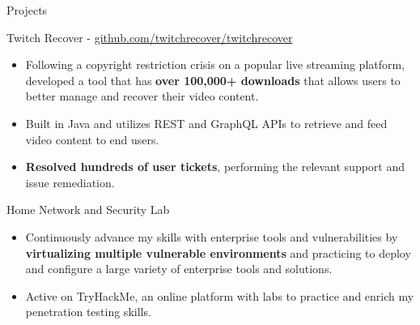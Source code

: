 \documentclass{article}
\newlength{\tabin}
\newlength{\secsep}
\newcommand{\lineunder}{\vspace*{-8pt} \\ \hspace*{-6pt} \hrulefill \\ \vspace*{-15pt}}
\newenvironment{tabbedsection}[1]{
  \begin{list}{}{
      \setlength{\itemsep}{0pt}
      \setlength{\labelsep}{0pt}
      \setlength{\labelwidth}{0pt}
      \setlength{\leftmargin}{\tabin}
      \setlength{\rightmargin}{\tabin}
      \setlength{\listparindent}{0pt}
      \setlength{\parsep}{0pt}
      \setlength{\parskip}{0pt}
      \setlength{\partopsep}{0pt}
      \setlength{\topsep}{#1}
    }
  \item[]
}{\end{list}}
\newenvironment{resume_section}[1]{
  \filbreak
  \vspace{2\secsep}
  \textsc{\color{blue}\large#1}
  \lineunder
  \begin{tabbedsection}{\secsep}
}{\end{tabbedsection}}
\newenvironment{resume_subsection}[2][]{
  \textbf{\color{BlueViolet}#2} \hfill {\normalsize #1} \hspace{-5em} 
  \begin{tabbedsection}{0.5\secsep}
}{\end{tabbedsection}}
\newenvironment{subitems}{
  \renewcommand{\labelitemi}{-}
  \begin{itemize}
      \setlength{\labelsep}{1em}
}{\end{itemize}}
\begin{document}
\begin{resume_section}{Projects}
\begin{resume_subsection}{Twitch Recover - \faGithub \hspace{0.01cm} \href{https://github.com/twitchrecover/twitchrecover}{github.com/twitchrecover/twitchrecover}}
		\begin{subitems}
                \item Following a copyright restriction crisis on a popular live streaming platform, developed a tool that has \textbf{over 100,000+ downloads} that allows users to better manage and recover their video content.
    			\item Built in Java and utilizes REST and GraphQL APIs to retrieve and feed video content to end users.
    			\item \textbf{Resolved hundreds of user tickets}, performing the relevant support and issue remediation.
		\end{subitems}
	\end{resume_subsection}
	\vspace{2\secsep}
  	\begin{resume_subsection}{Home Network and Security Lab}
  		\begin{subitems}
            \item Continuously advance my skills with enterprise tools and vulnerabilities by \textbf{virtualizing multiple vulnerable environments} and practicing to deploy and configure a large variety of enterprise tools and solutions. 
  			\item Active on TryHackMe, an online platform with labs to practice and enrich my penetration testing skills.
  		\end{subitems}
  	\end{resume_subsection}
\end{resume_section}
\end{document}
